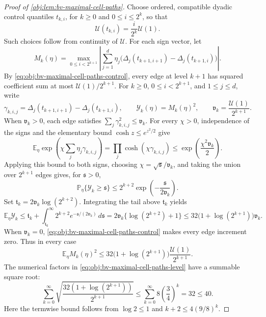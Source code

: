 \documentclass[11pt]{article}
\begin{document}
\begin{proof}[Proof of \cref{obj:lem:bv-maximal-cell-paths}]
Choose ordered, compatible dyadic control quantiles \(t_{k,i}\), for
\(k\ge0\) and \(0\le i\le2^k\), so that
\[
\mathcal U(t_{k,i})=\frac{i}{2^k}\mathcal U(1).
\]
Such choices follow from continuity of \(\mathcal U\). For each sign
vector, let
\[
M_k(\eta)=
\max_{0\le i<2^{k+1}}
\left|
\sum_{j=1}^d\eta_j
 \bigl(\Delta_j(t_{k+1,i+1})-\Delta_j(t_{k+1,i})\bigr)
\right|.
\]
By \cref{eq:obj:bv-maximal-cell-paths-control}, every edge at level \(k+1\) has squared coefficient sum at most
\(\mathcal U(1)/2^{k+1}\). For \(k\ge0\), \(0\le i<2^{k+1}\), and \(1\le j\le d\), write
\[
\gamma_{k,i,j}
=\Delta_j(t_{k+1,i+1})-\Delta_j(t_{k+1,i}),
\qquad
\mathcal Y_k(\eta)=M_k(\eta)^2,
\qquad
\mathfrak v_k=\frac{\mathcal U(1)}{2^{k+1}}.
\]
When \(\mathfrak v_k>0\), each edge satisfies
\(\sum_j\gamma_{k,i,j}^2\le\mathfrak v_k\). For every
\(\chi>0\), independence of the signs and the elementary bound
\(\cosh z\le e^{z^2/2}\) give
\[
\mathbb E_\eta\exp\!\left(\chi\sum_j\eta_j\gamma_{k,i,j}\right)
=\prod_j\cosh(\chi\gamma_{k,i,j})
\le\exp\!\left(\frac{\chi^2\mathfrak v_k}{2}\right).
\]
Applying this bound to both signs, choosing
\(\chi=\sqrt{\mathfrak s}/\mathfrak v_k\), and taking the union over
\(2^{k+1}\) edges gives, for \(\mathfrak s>0\),
\[
\mathbb P_\eta\{\mathcal Y_k\ge\mathfrak s\}
\le 2^{k+2}\exp\!\left(-\frac{\mathfrak s}{2\mathfrak v_k}\right).
\]
Set \(\mathfrak t_k=2\mathfrak v_k\log(2^{k+2})\). Integrating the
tail above \(\mathfrak t_k\) yields
\[
\mathbb E_\eta\mathcal Y_k
\le\mathfrak t_k+
 \int_{\mathfrak t_k}^\infty
 2^{k+2}e^{-\mathfrak s/(2\mathfrak v_k)}\,d\mathfrak s
=2\mathfrak v_k\{\log(2^{k+2})+1\}
\le32\bigl(1+\log(2^{k+1})\bigr)\mathfrak v_k.
\]
When \(\mathfrak v_k=0\), \cref{eq:obj:bv-maximal-cell-paths-control}
makes every edge increment zero. Thus in every case
\begin{equation}
\mathbb E_\eta M_k(\eta)^2
\le
32\bigl(1+\log(2^{k+1})\bigr)
   \frac{\mathcal U(1)}{2^{k+1}}.
\label{eq:obj:bv-maximal-cell-paths-level}
\end{equation}
The numerical factors in \cref{eq:obj:bv-maximal-cell-paths-level}
have a summable square root:
\begin{equation}
\sum_{k=0}^\infty
 \sqrt{\frac{32(1+\log(2^{k+1}))}{2^{k+1}}}
\le
\sum_{k=0}^\infty 8\left(\frac34\right)^k
=32\le40.
\label{eq:obj:bv-maximal-cell-paths-series}
\end{equation}
Here the termwise bound follows from \(\log 2\le1\) and
\(k+2\le4(9/8)^k\).


\end{proof}
\end{document}
